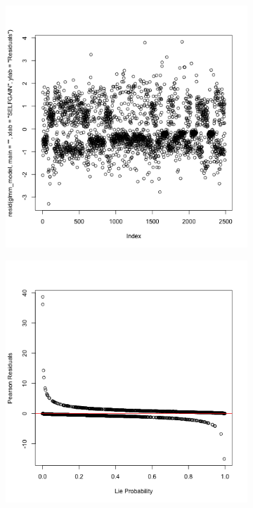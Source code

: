 \documentclass[man, floatsintext]{apa7}
\begin{document}
\begin{figure}[H]
	\centering
	
	\begin{subfigure}[b]{0.45\textwidth}
		\centering
		\includegraphics[width=\textwidth]{../plots/R/residuals}
		\label{fig:residuals}
	\end{subfigure}
	\hfill
	\begin{subfigure}[b]{0.45\textwidth}
		\centering
		\includegraphics[width=\textwidth]{../plots/R/pearson_residuals_vs_fitted}
		\label{fig:pearsonresidualsvsfitted}
	\end{subfigure}
	

\end{figure}
\end{document}
